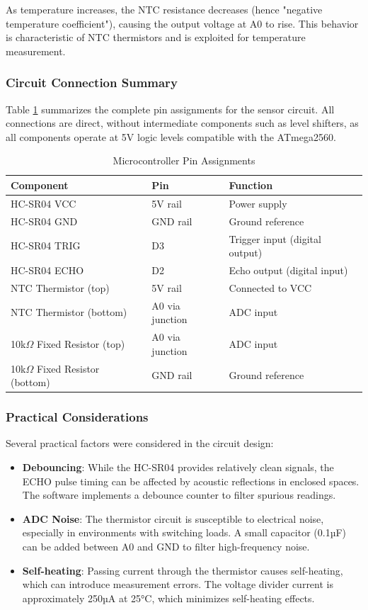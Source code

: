 As temperature increases, the NTC resistance decreases (hence "negative temperature coefficient"), causing the output voltage at A0 to rise. This behavior is characteristic of NTC thermistors and is exploited for temperature measurement.

\subsubsection{Circuit Connection Summary}
Table \ref{tab:pin_connections} summarizes the complete pin assignments for the sensor circuit. All connections are direct, without intermediate components such as level shifters, as all components operate at 5V logic levels compatible with the ATmega2560.

\begin{table}[H]
\centering
\caption{Microcontroller Pin Assignments}
\label{tab:pin_connections}
\begin{tabular}{|l|l|l|}
\hline
\textbf{Component} & \textbf{Pin} & \textbf{Function} \\ \hline
HC-SR04 VCC & 5V rail & Power supply \\ \hline
HC-SR04 GND & GND rail & Ground reference \\ \hline
HC-SR04 TRIG & D3 & Trigger input (digital output) \\ \hline
HC-SR04 ECHO & D2 & Echo output (digital input) \\ \hline
NTC Thermistor (top) & 5V rail & Connected to VCC \\ \hline
NTC Thermistor (bottom) & A0 via junction & ADC input \\ \hline
10k$\Omega$ Fixed Resistor (top) & A0 via junction & ADC input \\ \hline
10k$\Omega$ Fixed Resistor (bottom) & GND rail & Ground reference \\ \hline
\end{tabular}
\end{table}

\subsubsection{Practical Considerations}
Several practical factors were considered in the circuit design:
\begin{itemize}
    \item \textbf{Debouncing}: While the HC-SR04 provides relatively clean signals, the ECHO pulse timing can be affected by acoustic reflections in enclosed spaces. The software implements a debounce counter to filter spurious readings.
    \item \textbf{ADC Noise}: The thermistor circuit is susceptible to electrical noise, especially in environments with switching loads. A small capacitor (0.1µF) can be added between A0 and GND to filter high-frequency noise.
    \item \textbf{Self-heating}: Passing current through the thermistor causes self-heating, which can introduce measurement errors. The voltage divider current is approximately 250µA at 25°C, which minimizes self-heating effects.
\end{itemize}

